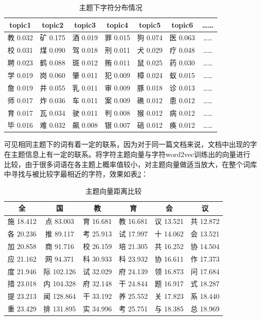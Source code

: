 \documentclass[winfonts,master,oneside,nobackinfo]{njuthesis}
\begin{document}
\begin{table}[h]
\centering
\begin{tabular}{ccccccc} %
\hline 
topic1& topic2& topic3& topic4& topic5& topic6&……\\
\hline  
教 0.032& 矿 0.175& 酒 0.019& 罪 0.015&狗 0.074&医 0.063&……\\
校 0.031& 煤 0.090& 驾 0.018& 刑 0.011&犬 0.029&疗 0.048&……\\
聘 0.023& 鹤 0.088& 斑 0.012& 贿 0.011&鼠 0.025&药 0.030&……\\
学 0.019& 岗 0.060& 肇 0.011& 犯 0.009&樟 0.024&蚁 0.015&……\\
詹 0.019& 井 0.055& 乳 0.011& 审 0.009&豚 0.018&诊 0.013&……\\
师 0.017& 炸 0.036& 车 0.011& 案 0.009&礁 0.012&患 0.012&……\\
育 0.017& 瓦 0.034& 驶 0.011& 判 0.008&猴 0.012&病 0.012&……\\
毕 0.016& 难 0.032& 飙 0.008& 银 0.007&碚 0.012&痪 0.012&……\\
\hline 
\end{tabular}
\caption{主题下字符分布情况}
\label{topic-char}
\end{table}

可见相同主题下的词有着一定的联系，因为对于同一篇文档来说，文档中出现的字在主题信息上有一定的联系。将字符主题向量与字符word2vec训练出的向量进行比较，由于很多词语在各主题上概率值较小，对主题向量做适当放大，在整个词库中寻找与被比较字最相近的字符，效果如表\ref{near-topic}：

\begin{table}[h]
\centering
\begin{tabular}{cccccc} %
\hline 
全& 国& 教& 育& 会& 议\\
\hline  
施 18.412& 点 83.003& 育 16.681& 教 16.681&议 13.521&共 12.872\\
各 20.236& 推 89.117& 考 25.913& 试 17.997&十 14.062&会 13.521\\
加 20.858& 商 91.716& 校 26.159& 培 21.305&共 16.252&协 14.504\\
应 21.162& 网 94.371& 科 30.933& 科 23.932&协 16.611&作 17.373\\
度 21.946& 际 102.126& 试 32.029& 府 24.139&领 16.873&问 17.684\\
措 23.018& 内 104.328& 府 32.148& 干 24.844&题 16.917&式 18.287\\
提 23.213& 闻 128.864& 干 33.192& 养 25.552&关 17.823&系 18.440\\
重 23.429& 排 131.895& 实 34.996& 考 25.751&与 18.385&总 18.969\\
\hline 
\end{tabular}
\caption{主题向量距离比较}
\label{near-topic}
\end{table}
\end{document}
